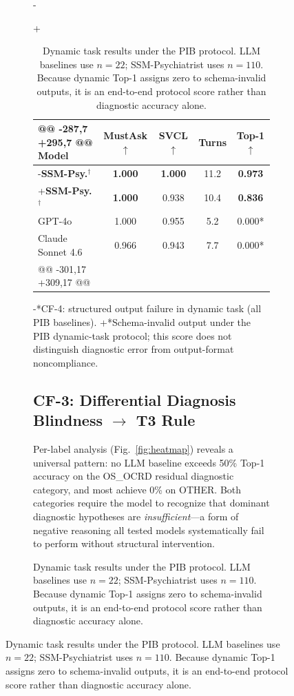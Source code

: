 \begin{figure}[t]
{\begin{figure}[!t]
{ \begin{table}[htbp]
-\caption{Dynamic Task Results. LLM baselines from PIB ($n=22$). All LLM Top-1 = 0.000 due to CF-4. SSM-Psychiatrist ($n=110$) eliminates CF-4 and achieves full coverage.}
+\caption{Dynamic task results under the PIB protocol. LLM baselines use $n=22$; SSM-Psychiatrist uses $n=110$. Because dynamic Top-1 assigns zero to schema-invalid outputs, it is an end-to-end protocol score rather than diagnostic accuracy alone.}
 \label{tab:dynamic}
 \begin{center}
 \begin{tabular}{lcccc}
@@ -287,7 +295,7 @@
 \textbf{Model} & \textbf{MustAsk$\uparrow$} & \textbf{SVCL$\uparrow$} & \textbf{Turns} & \textbf{Top-1$\uparrow$} \\
 \midrule
 \rowcolor[gray]{0.88}
-\textbf{SSM-Psy.}$^\dagger$ & \textbf{1.000} & \textbf{1.000} & 11.2 & \textbf{0.973} \\
+\textbf{SSM-Psy.}$^\dagger$ & \textbf{1.000} & 0.938 & 10.4 & \textbf{0.836} \\
 \midrule
 GPT-4o            & 1.000 & 0.955 & 5.2 & 0.000* \\
 Claude Sonnet 4.6 & 0.966 & 0.943 & 7.7 & 0.000* \\
@@ -301,17 +309,17 @@
 \bottomrule
 \end{tabular}
 \end{center}
-\footnotesize{*CF-4: structured output failure in dynamic task (all PIB baselines).}
+\footnotesize{*Schema-invalid output under the PIB dynamic-task protocol; this score does not distinguish diagnostic error from output-format noncompliance.}
 \end{table}
 
 \subsection{CF-3: Differential Diagnosis Blindness $\rightarrow$ T3 Rule}
 
 Per-label analysis (Fig.~\ref{fig:heatmap}) reveals a universal pattern: no LLM baseline exceeds 50\% Top-1 accuracy on the OS\_OCRD residual diagnostic category, and most achieve 0\% on OTHER. Both categories require the model to recognize that dominant diagnostic hypotheses are \textit{insufficient}---a form of negative reasoning all tested models systematically fail to perform without structural intervention.
 
}
\end{figure}}
\end{figure}
